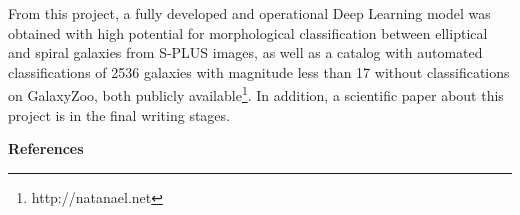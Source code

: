 \documentclass[10pt, a4paper, twocolumn]{article}
\begin{document}
From this project, a fully developed and operational Deep Learning model was obtained with high potential for morphological classification between elliptical and spiral galaxies from S-PLUS images, as well as a catalog with automated classifications of 2536 galaxies with magnitude less than 17 without classifications on GalaxyZoo, both publicly available\footnote{http://natanael.net}. In addition, a scientific paper about this project is in the final writing stages.


\begin{center}
  \bf\fontsize{13}{15.6}\selectfont References
\end{center}

\printbibliography[heading=none]
\end{document}
